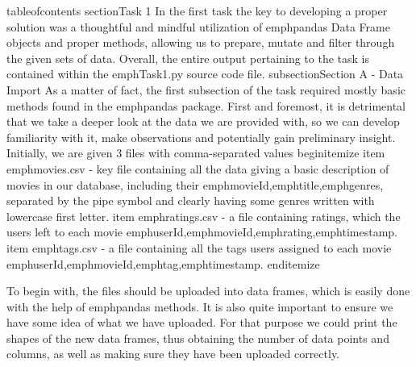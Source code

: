 tableofcontents
section{Task 1}
In the first task the key to developing a proper solution was a thoughtful and mindful utilization
of emph{pandas} Data Frame objects and proper methods, allowing us to prepare, mutate and filter through
the given sets of data. Overall, the entire output pertaining to the task is contained within the emph{Task1.py} source code file.
subsection{Section A - Data Import}
As a matter of fact, the first subsection of the task required mostly basic methods found in the
emph{pandas}  package. First and foremost, it is detrimental that we  take a deeper look at the data we are provided with, so we can develop familiarity with it, make observations and potentially gain preliminary insight.
Initially, we are given 3 files with comma-separated values
begin{itemize}
  item emph{movies.csv} - key file containing all the data giving a basic description of movies in our database, including  their emph{movieId},emph{title},emph{genres}, separated by the pipe symbol and clearly having some genres written with lowercase first letter.
  item emph{ratings.csv} - a file containing ratings, which the users left to each movie emph{userId},emph{movieId},emph{rating},emph{timestamp}.
  item emph{tags.csv} - a file containing all the tags users assigned to each movie emph{userId},emph{movieId},emph{tag},emph{timestamp}.
end{itemize}

To begin with, the files should  be uploaded into data frames, which is easily done with the help of 
emph{pandas} methods. It is also  quite important to ensure we have some idea of what we have uploaded. For that purpose we could print the shapes of the new data frames, thus obtaining the number of data points and columns, as well as making sure  they have been uploaded correctly.

